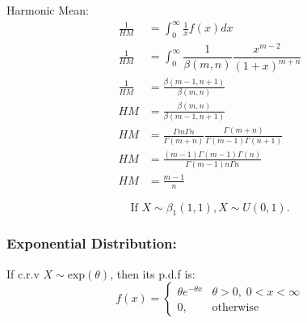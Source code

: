 \documentclass[
10pt, %
a4paper, %
]{report}
\begin{document}
Harmonic Mean:
\begin{align*}
    \frac{1}{HM} &= \int_0^\infty \frac{1}{x} f(x) dx \\
    \frac{1}{HM} &= \int_0^\infty \dfrac{1}{\beta(m, n)}\dfrac{x^{m-2}}{(1+x)^{m+n}} \\
    \frac{1}{HM} &= \frac{\beta(m-1, n+1)}{\beta(m, n)} \\
             HM  &= \frac{\beta(m, n)}{\beta(m-1, n+1)} \\
             HM  &= \frac{\Gamma m \Gamma n}{\Gamma (m+n)} \frac{\Gamma (m+n)}{\Gamma (m-1) \Gamma (n+1)} \\
             HM  &= \frac{(m-1)\Gamma(m-1)\Gamma(n)}{\Gamma(m-1) n \Gamma n} \\
    HM &= \frac{m-1}{n}
\end{align*}

\[
\text{If } X \sim \beta_1(1, 1), X\sim U(0, 1).
\]

\newpage
\subsubsection*{Exponential Distribution:}
If c.r.v \(X\sim \text{exp}(\theta)\), then its p.d.f is:
\[
    f(x)= 
\begin{cases}
    \theta e^{-\theta x}                   & {\theta>0,\; 0<x<\infty} \\
    0,                                     & \text{otherwise}
\end{cases}
\]
\end{document}
